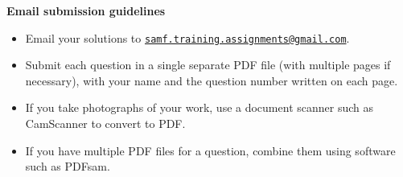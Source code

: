 \documentclass[a4paper,12pt,titlepage]{article}
\begin{document}
\newpage

\vfill
\textbf{\Large Email submission guidelines}
\begin{itemize}
	\item Email your solutions to \href{mailto:samf.training.assignments@gmail.com}{\texttt{samf.training.assignments@gmail.com}}.
	\item Submit each question in a single separate PDF file (with multiple pages if necessary), with your name and the question number written on each page.
	\item If you take photographs of your work, use a document scanner such as CamScanner to convert to PDF.
	\item If you have multiple PDF files for a question, combine them using software such as PDFsam.
\end{itemize}
\end{document}
